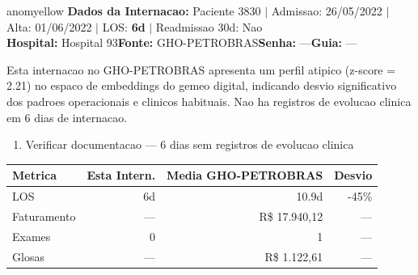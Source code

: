 \documentclass[a4paper,10pt]{article}
\begin{document}
\begin{anomalycard}[Internacao 3419 | GHO-PETROBRAS | MODERADO (z=2.21)]{anomyellow}
\textbf{Dados da Internacao:} Paciente 3830 $\mid$ Admissao: 26/05/2022 $\mid$ Alta: 01/06/2022 $\mid$ LOS: \textbf{6d} $\mid$ Readmissao 30d: Nao\\
\textbf{Hospital:} Hospital 93\quad\textbf{Fonte:} GHO-PETROBRAS\quad\textbf{Senha:} ---\quad\textbf{Guia:} ---\\
\vspace{2pt}\begin{tcolorbox}[colback=severityred!20,colframe=anomyellow,title={\textbf{Interpretacao de Negocio}},fonttitle=\bfseries\small,left=4pt,right=4pt,top=3pt,bottom=3pt]
{\small Esta internacao no GHO-PETROBRAS apresenta um perfil atipico (z-score = 2.21) no espaco de embeddings do gemeo digital, indicando desvio significativo dos padroes operacionais e clinicos habituais. Nao ha registros de evolucao clinica em 6 dias de internacao.}
\end{tcolorbox}
\begin{tcolorbox}[colback=severityyellow!30,colframe=anomorange,title={\textbf{Recomendacoes Especificas}},fonttitle=\bfseries\small,left=4pt,right=4pt,top=3pt,bottom=3pt]
\begin{enumerate}[nosep,leftmargin=16pt]
\item {\small Verificar documentacao --- 6 dias sem registros de evolucao clinica}
\end{enumerate}
\end{tcolorbox}
\begin{center}\begin{tabular}{l r r r}\toprule\textbf{Metrica} & \textbf{Esta Intern.} & \textbf{Media GHO-PETROBRAS} & \textbf{Desvio} \\\midrule
LOS & 6d & 10.9d & -45\% \\
Faturamento & --- & R\$ 17.940,12 & --- \\
Exames & 0 & 1 & --- \\
Glosas & --- & R\$ 1.122,61 & --- \\
\bottomrule\end{tabular}\end{center}


\end{anomalycard}
\end{document}
